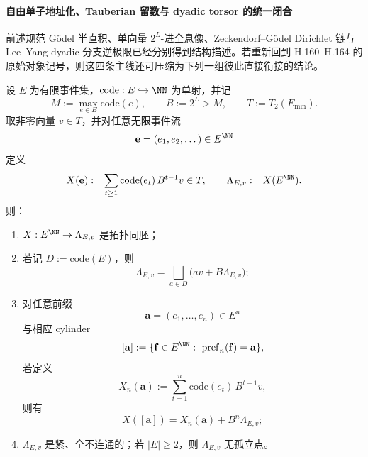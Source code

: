 \paragraph{自由单子地址化、Tauberian 留数与 dyadic torsor 的统一闭合}
前述规范 Gödel 半直积、单向量 \(2^L\)-进全息像、Zeckendorf--Gödel Dirichlet 链与 Lee--Yang dyadic 分支逆极限已经分别得到结构描述。若重新回到 H.160--H.164 的原始对象记号，则这四条主线还可压缩为下列一组彼此直接衔接的结论。

\begin{theorem}\label{thm:xi-time-part62d-hologram-image-cantor-homeomorphism}
设 \(E\) 为有限事件集，\(\mathrm{code}:E\hookrightarrow \NN\) 为单射，并记
\[
M:=\max_{e\in E}\mathrm{code}(e),
\qquad
B:=2^L>M,
\qquad
T:=T_2(E_{\min}).
\]
取非零向量 \(v\in T\)，并对任意无限事件流
\[
\mathbf e=(e_1,e_2,\dots)\in E^{\NN}
\]
定义
\[
X(\mathbf e):=\sum_{t\ge 1}\mathrm{code}(e_t)\,B^{t-1}v\in T,
\qquad
\Lambda_{E,v}:=X(E^{\NN}).
\]
则：
\begin{enumerate}
  \item \(X:E^{\NN}\to \Lambda_{E,v}\) 是拓扑同胚；
  \item 若记 \(D:=\mathrm{code}(E)\)，则
  \[
  \Lambda_{E,v}
  =
  \bigsqcup_{a\in D}\bigl(av+B\Lambda_{E,v}\bigr);
  \]
  \item 对任意前缀
  \[
  \mathbf a=(e_1,\dots,e_n)\in E^n
  \]
  与相应 cylinder
  \[
  [\mathbf a]:=\{\mathbf f\in E^{\NN}:\ \mathrm{pref}_n(\mathbf f)=\mathbf a\},
  \]
  若定义
  \[
  X_n(\mathbf a):=\sum_{t=1}^{n}\mathrm{code}(e_t)\,B^{t-1}v,
  \]
  则有
  \[
  X([\mathbf a])=X_n(\mathbf a)+B^n\Lambda_{E,v};
  \]
  \item \(\Lambda_{E,v}\) 是紧、全不连通的；若 \(|E|\ge 2\)，则 \(\Lambda_{E,v}\) 无孤立点。
\end{enumerate}
\end{theorem}
